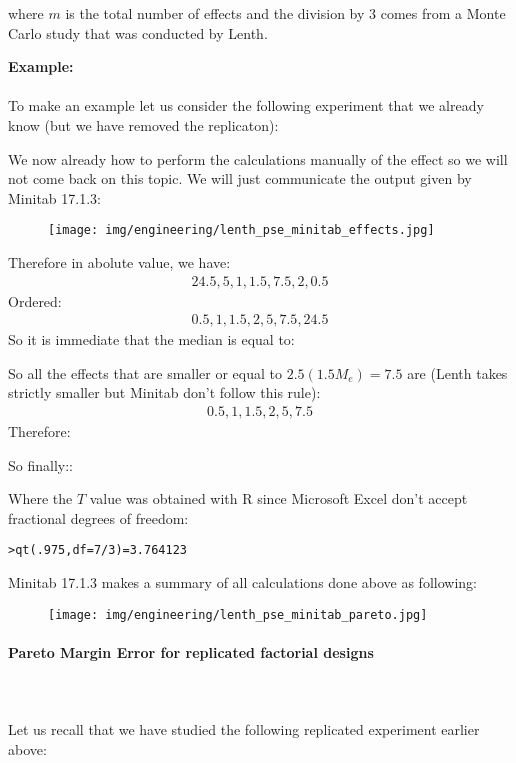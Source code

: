 	where $m$ is the total number of effects and the division by $3$ comes from a Monte Carlo study that was conducted by Lenth.
	\begin{tcolorbox}[colframe=black,colback=white,sharp corners]
	\textbf{{\Large {}}Example:}\\\\
	To make an example let us consider the following experiment that we already know (but we have removed the replicaton):
	
	We now already how to perform the calculations manually of the effect so we will not come back on this topic. We will just communicate the output given by Minitab 17.1.3:
	\begin{figure}[H]
		\centering
		\texttt{[image: img/engineering/lenth\_pse\_minitab\_effects.jpg]}	
	\end{figure}
	\end{tcolorbox}
	\begin{tcolorbox}[colframe=black,colback=white,sharp corners]
	Therefore in abolute value, we have:
	\begin{gather*}
		24.5, 5, 1, 1.5, 7.5, 2, 0.5
	\end{gather*}
	Ordered:
	\begin{gather*}
		0.5, 1, 1.5, 2, 5, 7.5, 24.5
	\end{gather*}
	So it is immediate that the median is equal to:
	
	So all the effects that are smaller or equal to $2.5(1.5M_e)=7.5$ are (Lenth takes strictly smaller but Minitab don't follow this rule):
	\begin{gather*}
		0.5, 1, 1.5, 2, 5, 7.5
	\end{gather*}
	Therefore:
	
	So finally::
	
	Where the $T$ value was obtained with R since Microsoft Excel don't accept fractional degrees of freedom:
	\begin{center}
	\texttt{>qt(.975,df=7/3)=3.764123}
	\end{center}
	Minitab 17.1.3 makes a summary of all calculations done above as following:
	\begin{figure}[H]
		\centering
		\texttt{[image: img/engineering/lenth\_pse\_minitab\_pareto.jpg]}	
	\end{figure}
	\end{tcolorbox}
	
	\paragraph{Pareto Margin Error for replicated factorial designs}\mbox{}\\\\
	Let us recall that we have studied the following replicated experiment earlier above:
	
